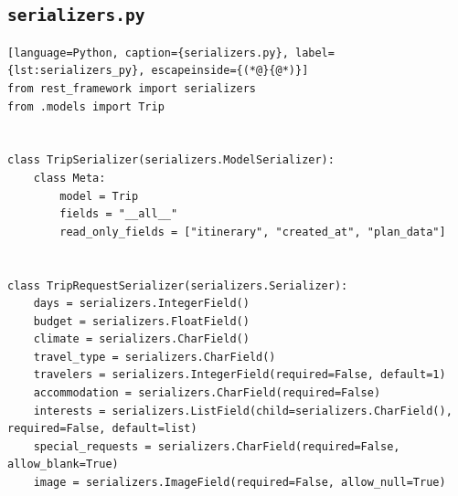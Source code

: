 \subsection{\texttt{serializers.py}}
\begin{lstlisting}[language=Python, caption={serializers.py}, label={lst:serializers_py}, escapeinside={(*@}{@*)}]
from rest_framework import serializers
from .models import Trip


class TripSerializer(serializers.ModelSerializer):
    class Meta:
        model = Trip
        fields = "__all__"
        read_only_fields = ["itinerary", "created_at", "plan_data"]


class TripRequestSerializer(serializers.Serializer):
    days = serializers.IntegerField()
    budget = serializers.FloatField()
    climate = serializers.CharField()
    travel_type = serializers.CharField()
    travelers = serializers.IntegerField(required=False, default=1)
    accommodation = serializers.CharField(required=False)
    interests = serializers.ListField(child=serializers.CharField(), required=False, default=list)
    special_requests = serializers.CharField(required=False, allow_blank=True)
    image = serializers.ImageField(required=False, allow_null=True)
\end{lstlisting}


